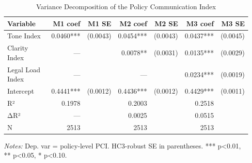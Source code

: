 \begin{table}[H]
\centering
\caption{Variance Decomposition of the Policy Communication Index}
\label{tab:table9_decomposition}
\begin{threeparttable}
\small
\begin{tabular}{lrrrrrr}
\toprule
\textbf{Variable} & \textbf{M1 coef} & \textbf{M1 SE} & \textbf{M2 coef} & \textbf{M2 SE} & \textbf{M3 coef} & \textbf{M3 SE} \\
\midrule
Tone Index & 0.0460*** & (0.0043) & 0.0454*** & (0.0043) & 0.0437*** & (0.0045) \\
Clarity Index & — &  & 0.0078** & (0.0031) & 0.0135*** & (0.0029) \\
Legal Load Index & — &  & — &  & 0.0234*** & (0.0019) \\
Intercept & 0.4441*** & (0.0012) & 0.4436*** & (0.0012) & 0.4429*** & (0.0011) \\
R² & 0.1978 &  & 0.2003 &  & 0.2518 &  \\
ΔR² & — &  & 0.0025 &  & 0.0515 &  \\
N & 2513 &  & 2513 &  & 2513 &  \\
\bottomrule
\end{tabular}
\begin{tablenotes}\small
\item \textit{Notes:} Dep. var = policy-level PCI. HC3-robust SE in parentheses. *** p<0.01, ** p<0.05, * p<0.10.
\end{tablenotes}
\end{threeparttable}
\end{table}